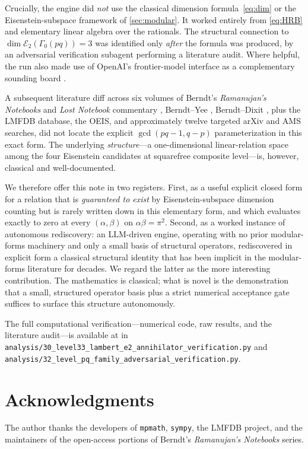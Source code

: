 \documentclass[11pt,reqno]{amsart}
\theoremstyle{definition}
\newcommand{\Eis}{\mathcal{E}}
\begin{document}
Crucially, the engine did \emph{not} use the classical dimension
formula~\eqref{eq:dim} or the Eisenstein-subspace framework of
\cref{sec:modular}. It worked entirely from \cref{eq:HRB} and
elementary linear algebra over the rationals. The structural
connection to $\dim \Eis_2(\Gamma_0(pq)) = 3$ was identified only
\emph{after} the formula was produced, by an adversarial verification
subagent performing a literature audit. Where helpful, the run also
made use of OpenAI's frontier-model interface as a complementary
sounding board \cite{ChatGPTPro}.

A subsequent literature diff \cite[diary~58]{ProjectC} across six
volumes of Berndt's \emph{Ramanujan's Notebooks} and \emph{Lost
Notebook} commentary \cite{BerndtNB2, AndrewsBerndt}, Berndt--Yee
\cite{BerndtYee}, Berndt--Dixit \cite{BerndtDixit}, plus the LMFDB
database, the OEIS, and approximately twelve targeted arXiv and AMS
searches, did not locate the explicit $\gcd(pq-1, q-p)$
parameterization in this exact form. The underlying \emph{structure}---a
one-dimensional linear-relation space among the four Eisenstein
candidates at squarefree composite level---is, however, classical
and well-documented.

We therefore offer this note in two registers. First, as a useful
explicit closed form for a relation that is \emph{guaranteed to
exist} by Eisenstein-subspace dimension counting but is rarely
written down in this elementary form, and which evaluates exactly to
zero at every $(\alpha, \beta)$ on $\alpha\beta = \pi^2$. Second, as
a worked instance of autonomous rediscovery: an LLM-driven engine,
operating with no prior modular-forms machinery and only a small
basis of structural operators, rediscovered in explicit form a
classical structural identity that has been implicit in the
modular-forms literature for decades. We regard the latter as the
more interesting contribution. The mathematics is classical; what is
novel is the demonstration that a small, structured operator basis
plus a strict numerical acceptance gate suffices to surface this
structure autonomously.

The full computational verification---numerical code, raw results,
and the literature audit---is available at \cite{ProjectC} in
\verb|analysis/30_level33_lambert_e2_annihilator_verification.py|
and \verb|analysis/32_level_pq_family_adversarial_verification.py|.

\section*{Acknowledgments}

The author thanks the developers of \texttt{mpmath}, \texttt{sympy},
the LMFDB project, and the maintainers of the open-access portions
of Berndt's \emph{Ramanujan's Notebooks} series.



\end{document}
